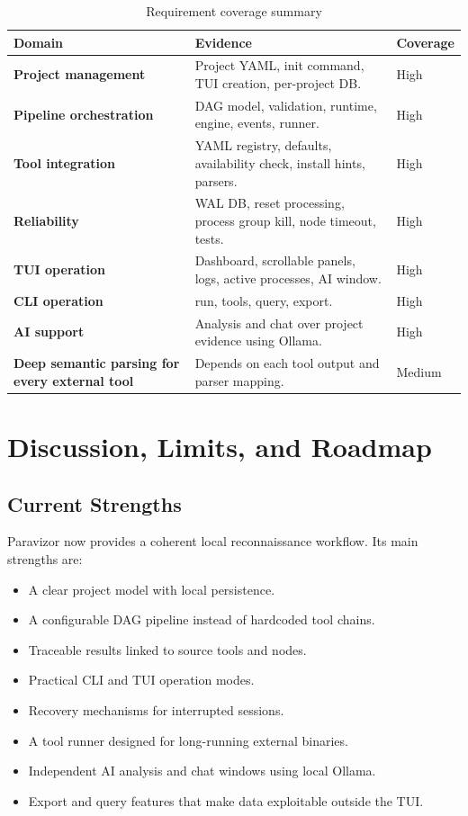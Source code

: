 \documentclass[a4paper,12pt]{article}
\begin{document}
\begin{table}[H]
    \centering
    \begin{tabularx}{\textwidth}{>{\bfseries}p{4cm}X>{\raggedright\arraybackslash}p{2.5cm}}
        \toprule
        Domain & Evidence & Coverage \\
        \midrule
        Project management & Project YAML, init command, TUI creation, per-project DB. & High \\
        Pipeline orchestration & DAG model, validation, runtime, engine, events, runner. & High \\
        Tool integration & YAML registry, defaults, availability check, install hints, parsers. & High \\
        Reliability & WAL DB, reset processing, process group kill, node timeout, tests. & High \\
        TUI operation & Dashboard, scrollable panels, logs, active processes, AI window. & High \\
        CLI operation & run, tools, query, export. & High \\
        AI support & Analysis and chat over project evidence using Ollama. & High \\
        Deep semantic parsing for every external tool & Depends on each tool output and parser mapping. & Medium \\
        \bottomrule
    \end{tabularx}
    \caption{Requirement coverage summary}
    \label{tab:coverage}
\end{table}

\newpage

\section{Discussion, Limits, and Roadmap}

\subsection{Current Strengths}

Paravizor now provides a coherent local reconnaissance workflow. Its main strengths are:

\begin{itemize}
    \item A clear project model with local persistence.
    \item A configurable DAG pipeline instead of hardcoded tool chains.
    \item Traceable results linked to source tools and nodes.
    \item Practical CLI and TUI operation modes.
    \item Recovery mechanisms for interrupted sessions.
    \item A tool runner designed for long-running external binaries.
    \item Independent AI analysis and chat windows using local Ollama.
    \item Export and query features that make data exploitable outside the TUI.
\end{itemize}
\end{document}
